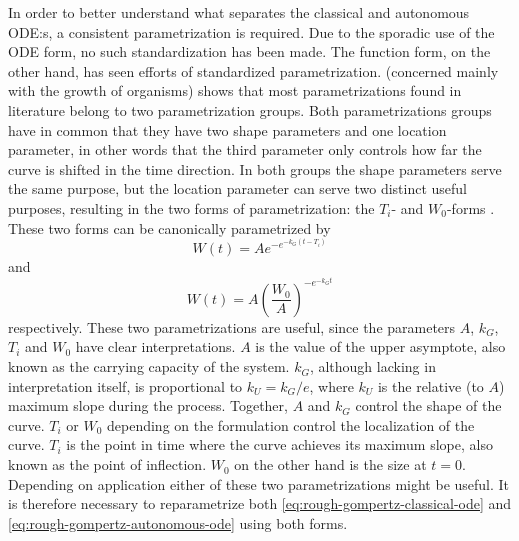 In order to better understand what separates the classical and autonomous ODE:s, a consistent parametrization is required.
Due to the sporadic use of the ODE form, no such standardization has been made.
The function form, on the other hand, has seen efforts of standardized parametrization.
\cite{tjorve2017gompertz} (concerned mainly with the growth of organisms) shows that most parametrizations found in literature belong to two parametrization groups.
Both parametrizations groups have in common that they have two shape parameters and one location parameter, in other words that the third parameter only controls how far the curve is shifted in the time direction.
In both groups the shape parameters serve the same purpose, but the location parameter can serve two distinct useful purposes, resulting in the two forms of parametrization: the \(T_i\)- and \(W_0\)-forms \cite{tjorve2017gompertz}.
These two forms can be canonically parametrized by
\begin{equation} \label{eq:gompertz-ti-function}
  W(t) = A e^{-e^{-k_G(t-T_i)}}
\end{equation}
and
\begin{equation} \label{eq:gompertz-w0-function}
  W(t) = A \left(\frac{W_0}{A}\right)^{-e^{-k_G t}}
\end{equation}
respectively.
These two parametrizations are useful, since the parameters \(A\), \(k_G\), \(T_i\) and \(W_0\) have clear interpretations.
\(A\) is the value of the upper asymptote, also known as the carrying capacity of the system.
\(k_G\), although lacking in interpretation itself, is proportional to \(k_U = k_G / e\), where \(k_U\) is the relative (to \(A\)) maximum slope during the process.
Together, \(A\) and \(k_G\) control the shape of the curve.
\(T_i\) or \(W_0\) depending on the formulation control the localization of the curve.
\(T_i\) is the point in time where the curve achieves its maximum slope, also known as the point of inflection.
\(W_0\) on the other hand is the size at \(t=0\).
Depending on application either of these two parametrizations might be useful.
It is therefore necessary to reparametrize both \cref{eq:rough-gompertz-classical-ode} and \cref{eq:rough-gompertz-autonomous-ode} using both forms.

